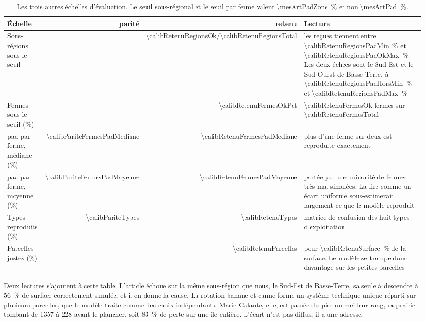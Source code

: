 \begin{table}[h]
  \centering
  \caption{Les trois autres échelles d'évaluation. Le seuil sous-régional et le seuil par
  ferme valent \SI{\mesArtPadZone}{\percent} et non \SI{\mesArtPad}{\percent}.}
  \label{tab:ann-echelles}
  \scriptsize
  \setlength{\tabcolsep}{4pt}
  \begin{tabularx}{\textwidth}{@{}p{28mm}rrX@{}}
    \toprule
    \textbf{Échelle} & \textbf{parité} & \textbf{retenu} & \textbf{Lecture} \\
    \midrule
    Sous-régions sous le seuil & & \num{\calibRetenuRegionsOk}/\num{\calibRetenuRegionsTotal} &
      les reçues tiennent entre \SI{\calibRetenuRegionsPadMin}{\percent} et
      \SI{\calibRetenuRegionsPadOkMax}{\percent}. Les deux échecs sont le Sud-Est et le
      Sud-Ouest de Basse-Terre, à \SI{\calibRetenuRegionsPadHorsMin}{\percent} et
      \SI{\calibRetenuRegionsPadMax}{\percent} \\
    Fermes sous le seuil (\%) & &
      \num{\calibRetenuFermesOkPct} &
      \num{\calibRetenuFermesOk} fermes sur \num{\calibRetenuFermesTotal} \\
    \gls{pad} par ferme, médiane (\%) & \num{\calibPariteFermesPadMediane} &
      \num{\calibRetenuFermesPadMediane} &
      plus d'une ferme sur deux est reproduite exactement \\
    \gls{pad} par ferme, moyenne (\%) & \num{\calibPariteFermesPadMoyenne} &
      \num{\calibRetenuFermesPadMoyenne} &
      portée par une minorité de fermes très mal simulées. La lire comme un écart uniforme
      sous-estimerait largement ce que le modèle reproduit \\
    Types reproduits (\%) & \num{\calibPariteTypes} & \num{\calibRetenuTypes} &
      matrice de confusion des huit types d'exploitation \\
    Parcelles justes (\%) & & \num{\calibRetenuParcelles} &
      pour \SI{\calibRetenuSurface}{\percent} de la surface. Le modèle se trompe donc
      davantage sur les petites parcelles \\
    \bottomrule
  \end{tabularx}
\end{table}

Deux lectures s'ajoutent à cette table. L'article échoue sur la même sous-région que nous, le
Sud-Est de Basse-Terre, sa seule à descendre à \SI{56}{\percent} de surface correctement
simulée, et il en donne la cause. La rotation banane et canne forme un système technique
unique réparti sur plusieurs parcelles, que le modèle traite comme des choix indépendants.
Marie-Galante, elle, est passée du pire au meilleur rang, sa prairie tombant de
\SI{1357}{\ha} à \SI{228}{\ha} avant le plancher, soit \SI{83}{\percent} de perte sur une île
entière. L'écart n'est pas diffus, il a une adresse.

